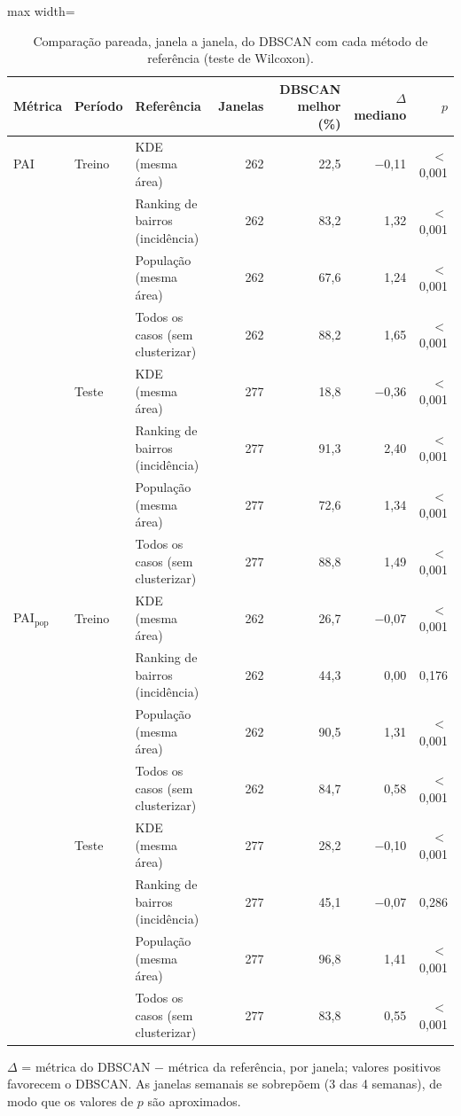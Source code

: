 \begin{table}[htbp]
\centering
\small
\caption{Comparação pareada, janela a janela, do DBSCAN com cada método de referência (teste de Wilcoxon).}
\label{tab:pareada}
\begin{adjustbox}{max width=\linewidth}
\begin{tabular}{lllrrrr}
\toprule
Métrica & Período & Referência & Janelas & DBSCAN melhor (\%) & $\Delta$ mediano & $p$ \\
\midrule
PAI & Treino & KDE (mesma área) & 262 & 22,5 & $-$0,11 & $<$0,001 \\
 &  & Ranking de bairros (incidência) & 262 & 83,2 & 1,32 & $<$0,001 \\
 &  & População (mesma área) & 262 & 67,6 & 1,24 & $<$0,001 \\
 &  & Todos os casos (sem clusterizar) & 262 & 88,2 & 1,65 & $<$0,001 \\
\addlinespace
 & Teste & KDE (mesma área) & 277 & 18,8 & $-$0,36 & $<$0,001 \\
 &  & Ranking de bairros (incidência) & 277 & 91,3 & 2,40 & $<$0,001 \\
 &  & População (mesma área) & 277 & 72,6 & 1,34 & $<$0,001 \\
 &  & Todos os casos (sem clusterizar) & 277 & 88,8 & 1,49 & $<$0,001 \\
\addlinespace
\midrule
PAI$_\text{pop}$ & Treino & KDE (mesma área) & 262 & 26,7 & $-$0,07 & $<$0,001 \\
 &  & Ranking de bairros (incidência) & 262 & 44,3 & 0,00 & 0,176 \\
 &  & População (mesma área) & 262 & 90,5 & 1,31 & $<$0,001 \\
 &  & Todos os casos (sem clusterizar) & 262 & 84,7 & 0,58 & $<$0,001 \\
\addlinespace
 & Teste & KDE (mesma área) & 277 & 28,2 & $-$0,10 & $<$0,001 \\
 &  & Ranking de bairros (incidência) & 277 & 45,1 & $-$0,07 & 0,286 \\
 &  & População (mesma área) & 277 & 96,8 & 1,41 & $<$0,001 \\
 &  & Todos os casos (sem clusterizar) & 277 & 83,8 & 0,55 & $<$0,001 \\
\bottomrule
\end{tabular}
\end{adjustbox}
\par\smallskip\begin{minipage}{0.95\linewidth}\footnotesize $\Delta$ = métrica do DBSCAN $-$ métrica da referência, por janela; valores positivos favorecem o DBSCAN. As janelas semanais se sobrepõem (3 das 4 semanas), de modo que os valores de $p$ são aproximados.\end{minipage}
\end{table}

